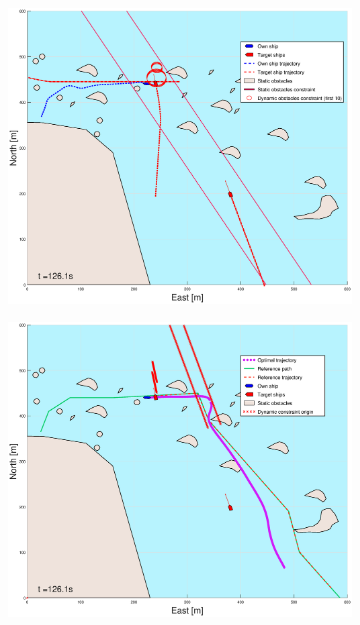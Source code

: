 \begin{figure}[ht]
\begin{subfigure}[b]{0.499\textwidth}
    \end{subfigure}
    \hfill
    \\
    \begin{subfigure}[b]{0.49\textwidth}
        \centering
        \includegraphics[width=\textwidth]{Images/Figures/skjergard_m_trafikk_NEW/_Simple_1fig1_time=126}
    \end{subfigure}
    \hfill
    \begin{subfigure}[b]{0.499\textwidth}
        \centering
        \includegraphics[width=\textwidth]{Images/Figures/skjergard_m_trafikk_NEW/_Simple_1fig999_time=126}

\end{subfigure}
\end{figure}
